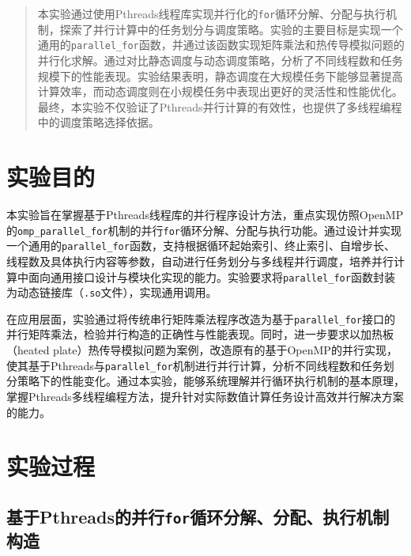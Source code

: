 \documentclass[a4paper, utf8]{ctexart}
\begin{document}
	\maketitle
	
	\renewcommand{\abstractname}{\large \textbf{摘要}}
	\begin{abstract}
		本实验通过使用Pthreads线程库实现并行化的\verb|for|循环分解、分配与执行机制，探索了并行计算中的任务划分与调度策略。实验的主要目标是实现一个通用的\verb|parallel_for|函数，并通过该函数实现矩阵乘法和热传导模拟问题的并行化求解。通过对比静态调度与动态调度策略，分析了不同线程数和任务规模下的性能表现。实验结果表明，静态调度在大规模任务下能够显著提高计算效率，而动态调度则在小规模任务中表现出更好的灵活性和性能优化。最终，本实验不仅验证了Pthreads并行计算的有效性，也提供了多线程编程中的调度策略选择依据。
		
	\end{abstract}
	
	\section{实验目的}
	
	本实验旨在掌握基于Pthreads线程库的并行程序设计方法，重点实现仿照OpenMP的\verb|omp_parallel_for|机制的并行\verb|for|循环分解、分配与执行功能。通过设计并实现一个通用的\verb|parallel_for|函数，支持根据循环起始索引、终止索引、自增步长、线程数及具体执行内容等参数，自动进行任务划分与多线程并行调度，培养并行计算中面向通用接口设计与模块化实现的能力。实验要求将\verb|parallel_for|函数封装为动态链接库（\verb|.so|文件），实现通用调用。
	
	在应用层面，实验通过将传统串行矩阵乘法程序改造为基于\verb|parallel_for|接口的并行矩阵乘法，检验并行构造的正确性与性能表现。同时，进一步要求以加热板（heated plate）热传导模拟问题为案例，改造原有的基于OpenMP的并行实现，使其基于Pthreads与\verb|parallel_for|机制进行并行计算，分析不同线程数和任务划分策略下的性能变化。通过本实验，能够系统理解并行循环执行机制的基本原理，掌握Pthreads多线程编程方法，提升针对实际数值计算任务设计高效并行解决方案的能力。
	
	\section{实验过程}
	
	\subsection{基于Pthreads的并行\texttt{for}循环分解、分配、执行机制构造}
	
\end{document}

